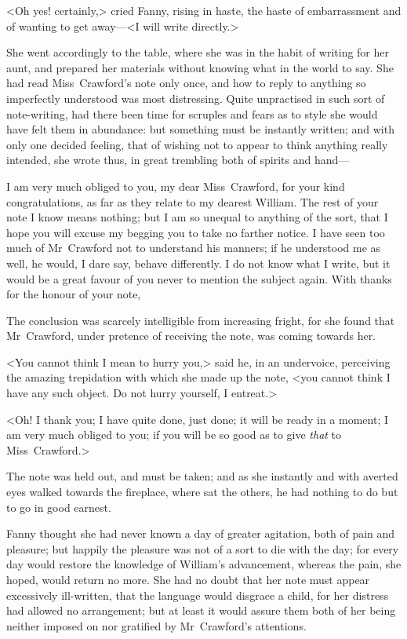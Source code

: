 <Oh yes! certainly,> cried Fanny, rising in haste, the haste of embarrassment and of wanting to get away—<I will write directly.>

She went accordingly to the table, where she was in the habit of writing for her aunt, and prepared her materials without knowing what in the world to say. She had read Miss~Crawford's note only once, and how to reply to anything so imperfectly understood was most distressing. Quite unpractised in such sort of note-writing, had there been time for scruples and fears as to style she would have felt them in abundance: but something must be instantly written; and with only one decided feeling, that of wishing not to appear to think anything really intended, she wrote thus, in great trembling both of spirits and hand—  

\begin{mail}{}{}
I am very much obliged to you, my dear Miss~Crawford, for your kind congratulations, as far as they relate to my dearest William. The rest of your note I know means nothing; but I am so unequal to anything of the sort, that I hope you will excuse my begging you to take no farther notice. I have seen too much of Mr~Crawford not to understand his manners; if he understood me as well, he would, I dare say, behave differently. I do not know what I write, but it would be a great favour of you never to mention the subject again. With thanks for the honour of your note, 

\end{mail}

The conclusion was scarcely intelligible from increasing fright, for she found that Mr~Crawford, under pretence of receiving the note, was coming towards her.

<You cannot think I mean to hurry you,> said he, in an undervoice, perceiving the amazing trepidation with which she made up the note, <you cannot think I have any such object. Do not hurry yourself, I entreat.>

<Oh! I thank you; I have quite done, just done; it will be ready in a moment; I am very much obliged to you; if you will be so good as to give \textit{that}  to Miss~Crawford.>

The note was held out, and must be taken; and as she instantly and with averted eyes walked towards the fireplace, where sat the others, he had nothing to do but to go in good earnest.

Fanny thought she had never known a day of greater agitation, both of pain and pleasure; but happily the pleasure was not of a sort to die with the day; for every day would restore the knowledge of William's advancement, whereas the pain, she hoped, would return no more. She had no doubt that her note must appear excessively ill-written, that the language would disgrace a child, for her distress had allowed no arrangement; but at least it would assure them both of her being neither imposed on nor gratified by Mr~Crawford's attentions. 